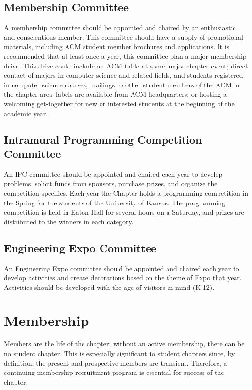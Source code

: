 \subsection*{Membership Committee}
A membership committee should be appointed and chaired by an enthusiastic and
conscientious member. This committee should have a supply of promotional
materials, including ACM student member brochures and applications. It is
recommended that at least once a year, this committee plan a major membership
drive. This drive could include an ACM table at some major chapter event; direct
contact of majors in computer science and related fields, and students
registered in computer science courses; mailings to other student members of the
ACM in the chapter area--labels are available from ACM headquarters; or hosting
a welcoming get-together for new or interested students at the beginning of the
academic year.

\subsection*{Intramural Programming Competition Committee}
An IPC committee should be appointed and chaired each year to develop problems,
solicit funds from sponsors, purchase prizes, and organize the competition
specifics. Each year the Chapter holds a programming competition in the Spring
for the students of the University of Kansas. The programming competition is
held in Eaton Hall for several hours on a Saturday, and prizes are distributed
to the winners in each category.

\subsection*{Engineering Expo Committee}
An Engineering Expo committee should be appointed and chaired each year to
develop activities and create decorations based on the theme of Expo that year.
Activities should be developed with the age of visitors in mind (K-12).

\section{Membership}

Members are the life of the chapter; without an active membership, there can be
no student chapter. This is especially significant to student chapters since, by
definition, the present and prospective members are transient. Therefore, a
continuing membership recruitment program is essential for success of the
chapter.


